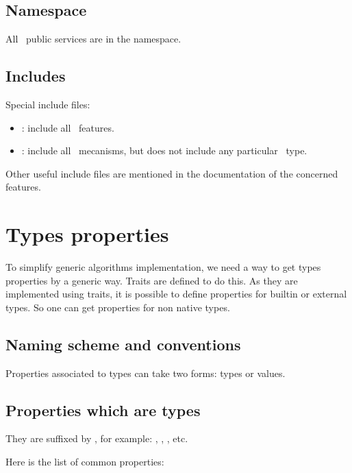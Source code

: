 \subsection{Namespace}

All \integre\ public services are in the  namespace.

\subsection{Includes}

Special include files:

\begin{itemize}
  \item {}: include all \integre\ features.

  \item {}: include all \integre\ mecanisms, but 
  does not include any particular \integre\ type.
\end{itemize}

Other useful include files are mentioned in the documentation of the
concerned features.


\section{Types properties}

To simplify generic algorithms implementation, we need a way to get
types properties by a generic way. Traits are defined to do this. As
they are implemented using traits, it is possible to define properties
for builtin or external types. So one can get properties for non
{\integre} native types.

\subsection{Naming scheme and conventions}

Properties associated to types can take two forms: types or values.

\subsection{Properties which are types}

They are suffixed by , for example: ,
, , etc.

Here is the list of common properties:


